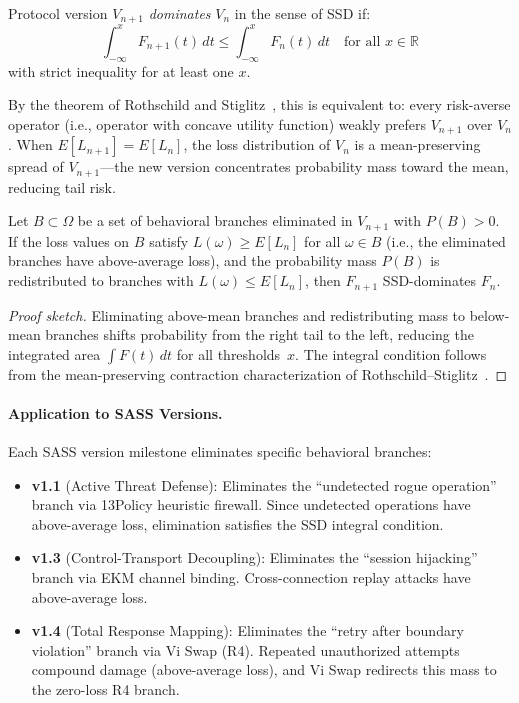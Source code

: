 \documentclass[sigconf,anonymous]{acmart}
\begin{document}
\begin{definition}
Protocol version $V_{n+1}$ \emph{dominates} $V_n$ in the sense of SSD if:
\begin{equation}
\int_{-\infty}^{x} F_{n+1}(t)\, dt \leq \int_{-\infty}^{x} F_n(t)\, dt \quad \text{for all } x \in \mathbb{R}
\end{equation}
with strict inequality for at least one $x$.
\end{definition}

By the theorem of Rothschild and Stiglitz~\cite{rothschild1970increasing}, this is equivalent to: every risk-averse operator (i.e., operator with concave utility function) weakly prefers $V_{n+1}$ over $V_n$. When $E[L_{n+1}] = E[L_n]$, the loss distribution of $V_n$ is a mean-preserving spread of $V_{n+1}$---the new version concentrates probability mass toward the mean, reducing tail risk.

\begin{theorem}
Let $B \subset \Omega$ be a set of behavioral branches eliminated in $V_{n+1}$ with $P(B) > 0$. If the loss values on $B$ satisfy $L(\omega) \geq E[L_n]$ for all $\omega \in B$ (i.e., the eliminated branches have above-average loss), and the probability mass $P(B)$ is redistributed to branches with $L(\omega) \leq E[L_n]$, then $F_{n+1}$ SSD-dominates $F_n$.
\end{theorem}

\begin{proof}[Proof sketch]
Eliminating above-mean branches and redistributing mass to below-mean branches shifts probability from the right tail to the left, reducing the integrated area $\int F(t)\,dt$ for all thresholds~$x$. The integral condition follows from the mean-preserving contraction characterization of Rothschild--Stiglitz~\cite{rothschild1970increasing}.
\end{proof}

\paragraph{Application to SASS Versions.}
Each SASS version milestone eliminates specific behavioral branches:

\begin{itemize}
\item \textbf{v1.1} (Active Threat Defense): Eliminates the ``undetected rogue operation'' branch via 13Policy heuristic firewall. Since undetected operations have above-average loss, elimination satisfies the SSD integral condition.

\item \textbf{v1.3} (Control-Transport Decoupling): Eliminates the ``session hijacking'' branch via EKM channel binding. Cross-connection replay attacks have above-average loss.

\item \textbf{v1.4} (Total Response Mapping): Eliminates the ``retry after boundary violation'' branch via Vi Swap (R4). Repeated unauthorized attempts compound damage (above-average loss), and Vi Swap redirects this mass to the zero-loss R4 branch.
\end{itemize}
\end{document}
